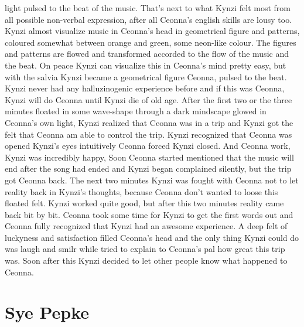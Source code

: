 \documentclass[12pt]{book}
\begin{document}
light pulsed to the beat of the music. That's next to what Kynzi felt most from all possible non-verbal expression, after all Ceonna's english skills are lousy too. Kynzi almost visualize music in Ceonna's head in geometrical figure and patterns, coloured somewhat between orange and green, some neon-like colour. The figures and patterns are flowed and transformed accorded to the flow of the music and the beat. On peace Kynzi can visualize this in Ceonna's mind pretty easy, but with the salvia Kynzi became a geometrical figure Ceonna, pulsed to the beat. Kynzi never had any halluzinogenic experience before and if this was Ceonna, Kynzi will do Ceonna until Kynzi die of old age. After the first two or the three minutes floated in some wave-shape through a dark mindscape glowed in Ceonna's own light, Kynzi realized that Ceonna was in a trip and Kynzi got the felt that Ceonna am able to control the trip. Kynzi recognized that Ceonna was opened Kynzi's eyes intuitively Ceonna forced Kynzi closed. And Ceonna work, Kynzi was incredibly happy, Soon Ceonna started mentioned that the music will end after the song had ended and Kynzi began complained silently, but the trip got Ceonna back. The next two minutes Kynzi was fought with Ceonna not to let reality back in Kynzi's thoughts, because Ceonna don't wanted to loose this floated felt. Kynzi worked quite good, but after this two minutes reality came back bit by bit. Ceonna took some time for Kynzi to get the first words out and Ceonna fully recognized that Kynzi had an awesome experience. A deep felt of luckyness and satisfaction filled Ceonna's head and the only thing Kynzi could do was laugh and smilr while tried to explain to Ceonna's pal how great this trip was. Soon after this Kynzi decided to let other people know what happened to Ceonna.



\chapter{Sye Pepke}
\end{document}
